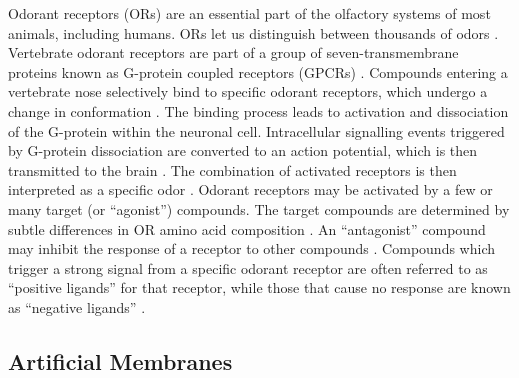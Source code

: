 \documentclass[
  a4paper,
]{scrbook}
\begin{document}
Odorant receptors (ORs) are an essential part of the olfactory systems
of most animals, including humans. ORs let us distinguish between
thousands of odors \autocite{Buck1991,Dung2018,Yang2018,Kim2022a}.
Vertebrate odorant receptors are part of a group of seven-transmembrane
proteins known as G-protein coupled receptors (GPCRs)
\autocite{Buck1991,Glatz2011,Dung2018,Wicher2021}. Compounds entering a
vertebrate nose selectively bind to specific odorant receptors, which
undergo a change in conformation \autocite{Dung2018,Kim2022a}. The
binding process leads to activation and dissociation of the G-protein
within the neuronal cell. Intracellular signalling events triggered by
G-protein dissociation are converted to an action potential, which is
then transmitted to the brain \autocite{Buck1991,Glatz2011,Zhang2021}.
The combination of activated receptors is then interpreted as a specific
odor \autocite{Sato2014,Kwon2015,Hurot2020,Kim2022a}. Odorant receptors
may be activated by a few or many target (or ``agonist'') compounds. The
target compounds are determined by subtle differences in OR amino acid
composition \autocite{Carraher2015,Yang2018,Goodwin2021}. An
``antagonist'' compound may inhibit the response of a receptor to other
compounds \autocite{Lee2012,Carraher2015}. Compounds which trigger a
strong signal from a specific odorant receptor are often referred to as
``positive ligands'' for that receptor, while those that cause no
response are known as ``negative ligands''
\autocite{Murugathas2019a,Murugathas2020,Yoo2022}.

\hypertarget{sec-artificial-membranes}{%
\subsection{Artificial Membranes}\label{sec-artificial-membranes}}
\end{document}
